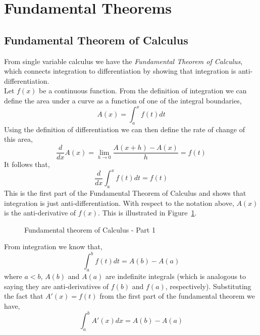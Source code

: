 \documentclass[12pt]{article}
\begin{document}
\pagebreak
\section{Fundamental Theorems}

\subsection{Fundamental Theorem of Calculus}

From single variable calculus we have the \emph{Fundamental Theorem of Calculus}, which connects integration to differentiation by showing that integration is anti-differentiation. \\

Let $f(x)$ be a continuous function. From the definition of integration we can define the area under a curve as a function of one of the integral boundaries,
\[
A(x) = \int_{a}^{x} f(t) dt
\]
Using the definition of differentiation we can then define the rate of change of this area,
\[
\frac{d}{dx}A(x) = \lim_{h\rightarrow0} \frac{A(x+h)-A(x)}{h} = f(t)
\]
It follows that,
\[
\frac{d}{dx} \int_{a}^{x} f(t) dt = f(t)
\]
This is the first part of the Fundamental Theorem of Calculus and shows that integration is just anti-differentiation. With respect to the notation above, $A(x)$ is the anti-derivative of $f(x)$. This is illustrated in Figure~\ref{fig:ftc1}. \\

\begin{figure}[h]
\centering
\caption{Fundamental theorem of Calculus - Part 1}
\label{fig:ftc1}
\end{figure}

From integration we know that,
\[
\int_{a}^{b} f(t)dt = A(b) - A(a) 
\] 
where $a<b$, $A(b)$ and $A(a)$ are indefinite integrals (which is analogous to saying they are anti-derivatives of $f(b)$ and $f(a)$, respectively). Substituting the fact that $A'(x) = f(t)$ from the first part of the fundamental theorem we have,
\[
\int_{a}^{b} A'(x)dx = A(b) - A(a) 
\]
\end{document}
